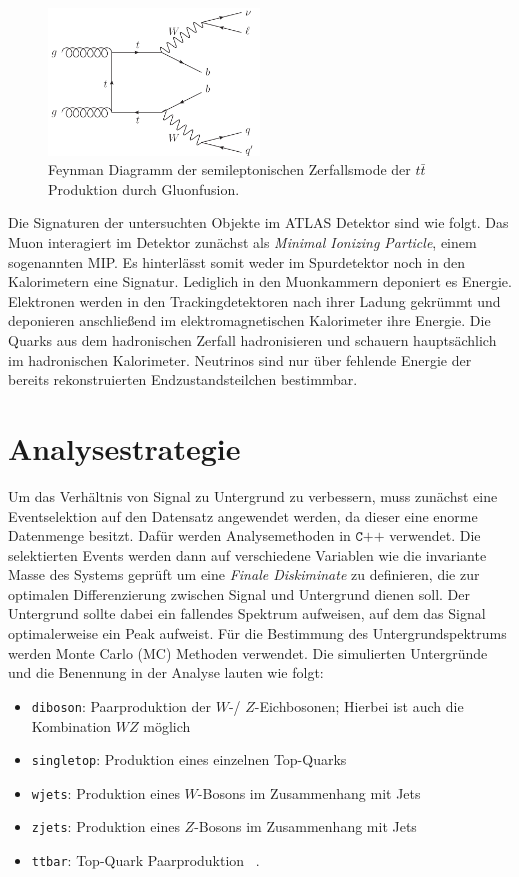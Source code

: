 \begin{figure}[h]
  \centering
  \includegraphics[width=0.5\textwidth]{content/graphics/pictures/Gluonfusion.png}
  \caption{Feynman Diagramm der semileptonischen Zerfallsmode der $t\bar{t}$ Produktion durch Gluonfusion.}
  \label{fig:gluonfusion}
\end{figure}

Die Signaturen der untersuchten Objekte im ATLAS Detektor sind wie folgt. Das Muon interagiert im Detektor zunächst als \textit{Minimal Ionizing Particle},
einem sogenannten MIP. Es hinterlässt somit weder im Spurdetektor noch in den Kalorimetern eine Signatur. Lediglich in den Muonkammern deponiert es
Energie. Elektronen werden in den Trackingdetektoren nach ihrer Ladung gekrümmt und deponieren anschließend im elektromagnetischen Kalorimeter ihre
Energie. Die Quarks aus dem hadronischen Zerfall hadronisieren und schauern hauptsächlich im hadronischen Kalorimeter. Neutrinos sind nur über fehlende
Energie der bereits rekonstruierten Endzustandsteilchen bestimmbar.

\section{Analysestrategie}
\label{sec:strategie}
Um das Verhältnis von Signal zu Untergrund zu verbessern, muss zunächst eine Eventselektion auf den Datensatz angewendet werden, da dieser eine enorme
Datenmenge besitzt. Dafür werden Analysemethoden in $\texttt{C++}$ verwendet. Die selektierten Events werden dann auf verschiedene Variablen wie die
invariante Masse des Systems geprüft um eine \textit{Finale Diskiminate} zu definieren, die zur optimalen Differenzierung zwischen Signal und
Untergrund dienen soll. Der Untergrund sollte dabei ein fallendes Spektrum aufweisen, auf dem das Signal optimalerweise ein Peak aufweist. Für die
Bestimmung des Untergrundspektrums werden Monte Carlo (MC) Methoden verwendet. Die simulierten Untergründe und die Benennung in der Analyse lauten
wie folgt:

\begin{itemize}
    \item \texttt{diboson}: Paarproduktion der $W$-/ $Z$-Eichbosonen; Hierbei ist auch die Kombination $WZ$ möglich
    \item \texttt{singletop}: Produktion eines einzelnen Top-Quarks
    \item \texttt{wjets}: Produktion eines $W$-Bosons im Zusammenhang mit Jets
    \item \texttt{zjets}: Produktion eines $Z$-Bosons im Zusammenhang mit Jets
    \item \texttt{ttbar}: Top-Quark Paarproduktion \, .
\end{itemize}

